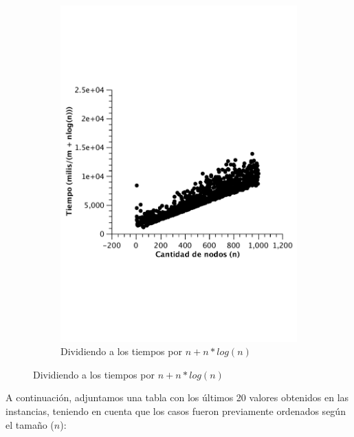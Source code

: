 \begin{figure}[H]
        \begin{subfigure}[b]{0.5\textwidth}
                \includegraphics[width=\textwidth]{imagenes/completo-matriz-4.pdf}
                \caption{Dividiendo a los tiempos por $n + n*log(n)$}
        \end{subfigure}
\end{figure}

A continuación, adjuntamos una tabla con los últimos 20 valores obtenidos en las instancias, teniendo en cuenta que los casos fueron previamente ordenados según el tamaño ($n$):

